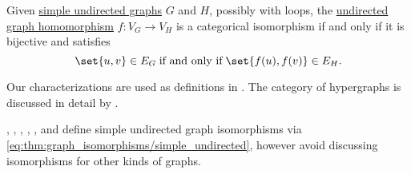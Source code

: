 \begin{proposition}
\begin{thmenum}
     Given \hyperref[def:undirected_graph]{simple undirected graphs} \( G \) and \( H \), possibly with loops, the \hyperref[def:undirected_graph/homomorphism]{undirected graph homomorphism} \( f: V_G \to V_H \) is a categorical isomorphism if and only if it is bijective and satisfies
    \begin{equation}\label{eq:thm:graph_isomorphisms/simple_undirected}
      \set{ u, v } \in E_G \T{if and only if} \set{ f(u), f(v) } \in E_H.
    \end{equation}
  \end{thmenum}
\end{proposition}
\begin{comments}
  \item Our characterizations are used as definitions in \cite[578]{Rosen2018DiscreteHandbook}. The category of hypergraphs is discussed in detail by .

  , , , , ,  and  define simple undirected graph isomorphisms via \eqref{eq:thm:graph_isomorphisms/simple_undirected}, however avoid discussing isomorphisms for other kinds of graphs.
\end{comments}
